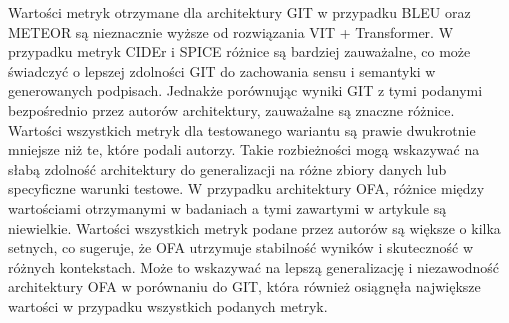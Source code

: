 \noindent Wartości metryk otrzymane dla architektury GIT w przypadku BLEU oraz METEOR są nieznacznie wyższe od rozwiązania VIT + Transformer. W przypadku metryk CIDEr i SPICE różnice są bardziej zauważalne, co może świadczyć o lepszej zdolności GIT do zachowania sensu i semantyki w generowanych podpisach. Jednakże porównując wyniki GIT z tymi podanymi bezpośrednio przez autorów architektury, zauważalne są znaczne różnice. Wartości wszystkich metryk dla testowanego wariantu są prawie dwukrotnie mniejsze niż te, które podali autorzy. Takie rozbieżności mogą wskazywać na słabą zdolność architektury do generalizacji na różne zbiory danych lub specyficzne warunki testowe. W przypadku architektury OFA, różnice między wartościami otrzymanymi w badaniach a tymi zawartymi w artykule są niewielkie. Wartości wszystkich metryk podane przez autorów są większe o kilka setnych, co sugeruje, że OFA utrzymuje stabilność wyników i skuteczność w różnych kontekstach. Może to wskazywać na lepszą generalizację i niezawodność architektury OFA w porównaniu do GIT, która również osiągnęła największe wartości w przypadku wszystkich podanych metryk.
